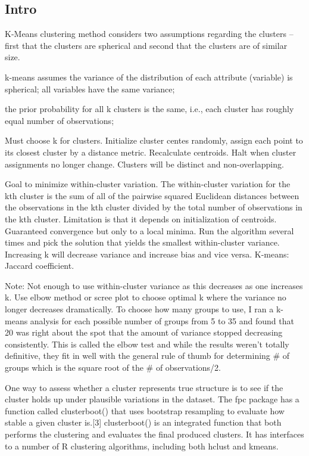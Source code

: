 \documentclass[]{book}
\begin{document}
\subsection{Intro}\label{intro-4}

K-Means clustering method considers two assumptions regarding the
clusters -- first that the clusters are spherical and second that the
clusters are of similar size.

k-means assumes the variance of the distribution of each attribute
(variable) is spherical; all variables have the same variance;

the prior probability for all k clusters is the same, i.e., each cluster
has roughly equal number of observations;

Must choose k for clusters. Initialize cluster centes randomly, assign
each point to its closest cluster by a distance metric. Recalculate
centroids. Halt when cluster assignments no longer change. Clusters will
be distinct and non-overlapping.

Goal to minimize within-cluster variation. The within-cluster variation
for the kth cluster is the sum of all of the pairwise squared Euclidean
distances between the observations in the kth cluster divided by the
total number of observations in the kth cluster. Limitation is that it
depends on initialization of centroids. Guaranteed convergence but only
to a local minima. Run the algorithm several times and pick the solution
that yields the smallest within-cluster variance. Increasing k will
decrease variance and increase bias and vice versa. K-means: Jaccard
coefficient.

Note: Not enough to use within-cluster variance as this decreases as one
increases k. Use elbow method or scree plot to choose optimal k where
the variance no longer decreases dramatically. To choose how many groups
to use, I ran a k-means analysis for each possible number of groups from
5 to 35 and found that 20 was right about the spot that the amount of
variance stopped decreasing consistently. This is called the elbow test
and while the results weren't totally definitive, they fit in well with
the general rule of thumb for determining \# of groups which is the
square root of the \# of observations/2.

One way to assess whether a cluster represents true structure is to see
if the cluster holds up under plausible variations in the dataset. The
fpc package has a function called clusterboot() that uses bootstrap
resampling to evaluate how stable a given cluster is.{[}3{]}
clusterboot() is an integrated function that both performs the
clustering and evaluates the final produced clusters. It has interfaces
to a number of R clustering algorithms, including both hclust and
kmeans.
\end{document}
